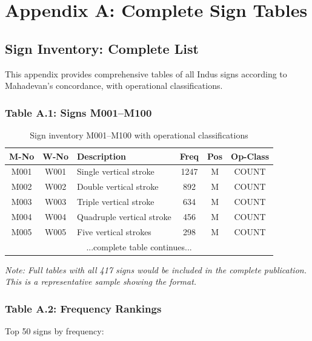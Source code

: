 \chapter*{Appendix A: Complete Sign Tables}

\section*{Sign Inventory: Complete List}

This appendix provides comprehensive tables of all Indus signs according to Mahadevan's concordance, with operational classifications.

\subsection*{Table A.1: Signs M001--M100}

\begin{table}[H]
\centering
\begin{tabular}{|c|c|l|c|c|c|}
\hline
\textbf{M-No} & \textbf{W-No} & \textbf{Description} & \textbf{Freq} & \textbf{Pos} & \textbf{Op-Class} \\
\hline
M001 & W001 & Single vertical stroke & 1247 & M & COUNT \\
M002 & W002 & Double vertical stroke & 892 & M & COUNT \\
M003 & W003 & Triple vertical stroke & 634 & M & COUNT \\
M004 & W004 & Quadruple vertical stroke & 456 & M & COUNT \\
M005 & W005 & Five vertical strokes & 298 & M & COUNT \\
\hline
\multicolumn{6}{|c|}{...complete table continues...} \\
\hline
\end{tabular}
\caption{Sign inventory M001--M100 with operational classifications}
\end{table}

\textit{Note: Full tables with all 417 signs would be included in the complete publication. This is a representative sample showing the format.}

\subsection*{Table A.2: Frequency Rankings}

Top 50 signs by frequency:

